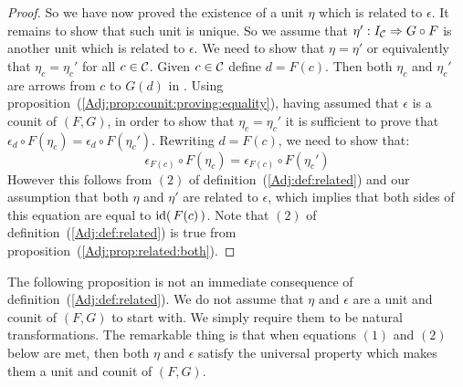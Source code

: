 \begin{proof}
    So we have now proved the existence of a unit $\eta$ which is
    related to $\epsilon$. It remains to show that such unit is unique.
    So we assume that $\eta':I_{\cal C}\Rightarrow G\circ F$ is 
    another unit which is related to $\epsilon$. We need to show that
    $\eta=\eta'$ or equivalently that $\eta_{c}=\eta_{c}'$
    for all $c\in\mbox{$\cal C$}$. Given $c\in\mbox{$\cal C$}$ define $d=F(c)$. Then both 
    $\eta_{c}$ and $\eta_{c}'$ are arrows from $c$ to $G(d)$ in
    \Cat. Using proposition~(\ref{Adj:prop:counit:proving:equality}), having
    assumed that $\epsilon$ is a counit of $(F,G)$, in order to show that 
    $\eta_{c}=\eta_{c}'$ it is sufficient to prove that
    $\epsilon_{d}\circ F(\eta_{c})=\epsilon_{d}\circ F(\eta_{c}')$. Rewriting
    $d=F(c)$, we need to show that:
        \[
            \epsilon_{F(c)}\circ F(\eta_{c})=\epsilon_{F(c)}\circ F(\eta_{c}')
        \]
    However this follows from $(2)$ of definition~(\ref{Adj:def:related}) and
    our assumption that both $\eta$ and $\eta'$ are related to $\epsilon$,
    which implies that both sides of this equation are equal to $\mbox{\rm id}(\,F(c)\,)$.
    Note that $(2)$ of definition~(\ref{Adj:def:related}) is true from
    proposition~(\ref{Adj:prop:related:both}).
\end{proof}

The following proposition is not an immediate consequence of 
definition~(\ref{Adj:def:related}). We do not assume that $\eta$ and
$\epsilon$ are a unit and counit of $(F,G)$ to start with. We simply
require them to be natural transformations. The remarkable thing
is that when equations $(1)$ and $(2)$ below are met, then both
$\eta$ and $\epsilon$ satisfy the universal property which makes
them a unit and counit of $(F,G)$.

